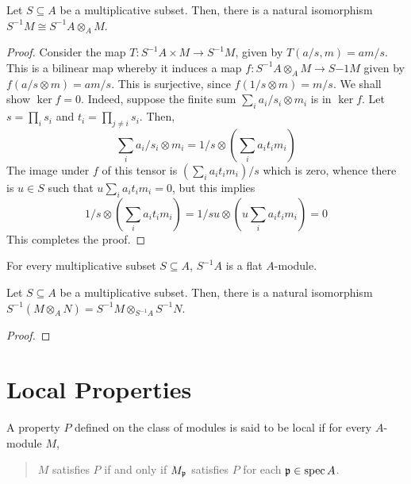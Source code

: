 \begin{proposition}
    Let $S\subseteq A$ be a multiplicative subset. Then, there is a natural isomorphism $S^{-1}M\cong S^{-1}A\otimes_A M$.
\end{proposition}
\begin{proof}
    Consider the map $T: S^{-1}A\times M\to S^{-1}M$, given by $T(a/s, m) = am/s$. This is a bilinear map whereby it induces a map $f: S^{-1}A\otimes_A M\to S{-1}M$ given by $f(a/s\otimes m) = am/s$. This is surjective, since $f(1/s\otimes m) = m/s$. We shall show $\ker f = 0$. Indeed, suppose the finite sum $\sum_i a_i/s_i\otimes m_i$ is in $\ker f$. Let $s = \prod_i s_i$ and $t_i = \prod_{j\ne i}s_i$. Then, 
    \begin{equation*}
        \sum_{i}a_i/s_i\otimes m_i = 1/s\otimes\left(\sum_i a_it_im_i\right)
    \end{equation*}
    The image under $f$ of this tensor is $(\sum_i a_it_im_i)/s$ which is zero, whence there is $u\in S$ such that $u\sum_i a_it_im_i = 0$, but this implies 
    \begin{equation*}
        1/s\otimes\left(\sum_i a_it_im_i\right) = 1/su\otimes\left(u\sum_i a_it_im_i\right) = 0
    \end{equation*}
    This completes the proof.
\end{proof}
\begin{corollary}
    For every multiplicative subset $S\subseteq A$, $S^{-1}A$ is a flat $A$-module.
\end{corollary}

\begin{proposition}
    Let $S\subseteq A$ be a multiplicative subset. Then, there is a natural isomorphism $S^{-1}(M\otimes_A N) = S^{-1}M\otimes_{S^{-1}A}S^{-1}N$.
\end{proposition}
\begin{proof}
\end{proof}

\section{Local Properties}

A property $P$ defined on the class of modules is said to be local if for every $A$-module $M$,
\begin{quotation}
    $M$ satisfies $P$ if and only if $M_\mathfrak p$ satisfies $P$ for each $\mathfrak p\in\operatorname{spec} A$.
\end{quotation}

